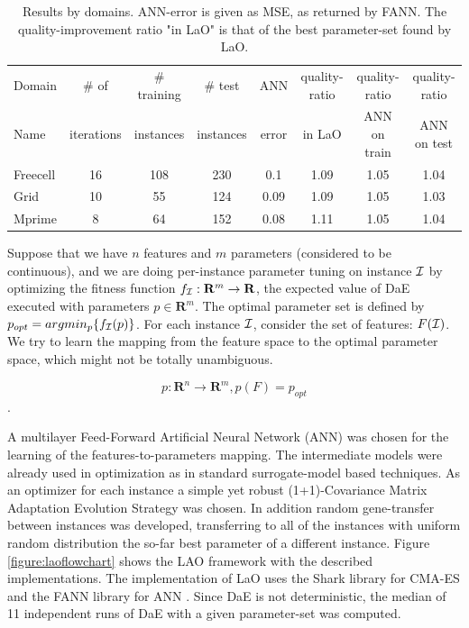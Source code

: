 \documentclass{MYsig-alternate}
\begin{document}
\begin{table}[ht] 
\centering
\begin{tabular}{l c c c c c c c}
\hline\hline
Domain & \# of & \# training & \# test &  ANN & quality-ratio & quality-ratio & quality-ratio \\ 
Name & iterations  & instances &  instances &  error & in LaO & ANN on train & ANN on test \\ 
\hline
Freecell& 16 & 108 & 230 & 0.1 & 1.09 & 1.05 & 1.04  \\
Grid & 10 & 55 & 124 & 0.09 & 1.09 & 1.05 & 1.03  \\
Mprime & 8 & 64 & 152 & 0.08 & 1.11 & 1.05 & 1.04   \\
\hline
\end{tabular}
\caption{Results by domains. ANN-error is given as MSE, as returned by FANN. The quality-improvement ratio "in LaO" is that of the best parameter-set found by LaO.}
\label{table:domains}
\end{table} 

Suppose that we have $n$ features and $m$ parameters (considered to be continuous), and we are doing per-instance parameter tuning on instance $\cal I$ by optimizing the fitness function \begin{math}f_{\cal I}:\mathbf{R}^m\to \mathbf{R} \end{math}, the expected value of DaE executed with parameters \begin{math} p \in \mathbf{R}^m \end{math}. The optimal parameter set is defined by \begin{math} p_{opt}=argmin_p\{f_{\cal I}(p)\} \end{math}. For each instance $\cal I$, consider the set of features: \begin{math} F({\cal I}) \end{math}. We try to learn the mapping from the feature space to the optimal parameter space, which might not be totally unambiguous.

\begin{equation} p: \mathbf{R}^n \to \mathbf{R}^m, p(F)=p_{opt} \end{equation}.	

A multilayer Feed-Forward Artificial Neural Network (ANN) was chosen for the learning of the features-to-parameters mapping. The intermediate models were already used in optimization as in standard surrogate-model based techniques. As an optimizer for each instance a simple yet robust (1+1)-Covariance Matrix Adaptation Evolution Strategy \cite{hansen2001ecj} was chosen. In addition random gene-transfer between instances was developed, transferring to all of the instances with uniform random distribution the so-far best parameter of a different instance. Figure \ref{figure:laoflowchart} shows the LAO framework with the described implementations. The implementation of LaO uses the Shark library \cite{shark08} for CMA-ES and the FANN library for ANN \cite{nissen}. Since DaE is not deterministic, the median of 11 independent runs of DaE with a given parameter-set was computed.
\end{document}
